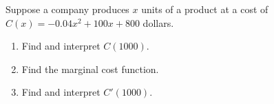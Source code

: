 \documentclass[12pt]{article}
\begin{document}
\vspace{3mm}

\newpage

\Example Suppose a company produces $x$ units of a product at a cost of $C(x)=-0.04x^2+100x+800$ dollars.

\begin{enumerate}
\item[\tc{1}] Find and interpret $C(1000)$.

\vspace{30mm}

\item[\tc{2}] Find the marginal cost function.

\vspace{30mm}

\item[\tc{3}] Find and interpret $C'(1000)$.
\end{enumerate}
\end{document}
